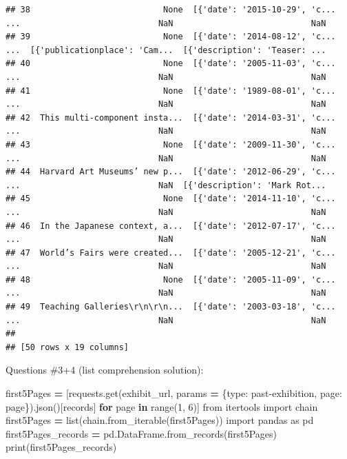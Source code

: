 \documentclass[
]{book}
\newenvironment{Shaded}{\begin{snugshade}}{\end{snugshade}}
\newcommand{\BuiltInTok}[1]{#1}
\newcommand{\ControlFlowTok}[1]{\textcolor[rgb]{0.13,0.29,0.53}{\textbf{#1}}}
\newcommand{\DecValTok}[1]{\textcolor[rgb]{0.00,0.00,0.81}{#1}}
\newcommand{\ImportTok}[1]{#1}
\newcommand{\KeywordTok}[1]{\textcolor[rgb]{0.13,0.29,0.53}{\textbf{#1}}}
\newcommand{\NormalTok}[1]{#1}
\newcommand{\OperatorTok}[1]{\textcolor[rgb]{0.81,0.36,0.00}{\textbf{#1}}}
\newcommand{\StringTok}[1]{\textcolor[rgb]{0.31,0.60,0.02}{#1}}
\begin{document}
\begin{alert}
\begin{verbatim}
## 38                           None  [{'date': '2015-10-29', 'c...  ...                            NaN                            NaN
## 39                           None  [{'date': '2014-08-12', 'c...  ...  [{'publicationplace': 'Cam...  [{'description': 'Teaser: ...
## 40                           None  [{'date': '2005-11-03', 'c...  ...                            NaN                            NaN
## 41                           None  [{'date': '1989-08-01', 'c...  ...                            NaN                            NaN
## 42  This multi-component insta...  [{'date': '2014-03-31', 'c...  ...                            NaN                            NaN
## 43                           None  [{'date': '2009-11-30', 'c...  ...                            NaN                            NaN
## 44  Harvard Art Museums’ new p...  [{'date': '2012-06-29', 'c...  ...                            NaN  [{'description': 'Mark Rot...
## 45                           None  [{'date': '2014-11-10', 'c...  ...                            NaN                            NaN
## 46  In the Japanese context, a...  [{'date': '2012-07-17', 'c...  ...                            NaN                            NaN
## 47  World’s Fairs were created...  [{'date': '2005-12-21', 'c...  ...                            NaN                            NaN
## 48                           None  [{'date': '2005-11-09', 'c...  ...                            NaN                            NaN
## 49  Teaching Galleries\r\n\r\n...  [{'date': '2003-03-18', 'c...  ...                            NaN                            NaN
## 
## [50 rows x 19 columns]
\end{verbatim}

Questions \#3+4 (list comprehension solution):

\begin{Shaded}
\begin{Highlighting}[]
\NormalTok{first5Pages }\OperatorTok{=}\NormalTok{ [requests.get(exhibit\_url, params }\OperatorTok{=}\NormalTok{ \{}\StringTok{\textquotesingle{}type\textquotesingle{}}\NormalTok{: }\StringTok{\textquotesingle{}past{-}exhibition\textquotesingle{}}\NormalTok{, }\StringTok{\textquotesingle{}page\textquotesingle{}}\NormalTok{: page\}).json()[}\StringTok{\textquotesingle{}records\textquotesingle{}}\NormalTok{] }\ControlFlowTok{for}\NormalTok{ page }\KeywordTok{in} \BuiltInTok{range}\NormalTok{(}\DecValTok{1}\NormalTok{, }\DecValTok{6}\NormalTok{)]}
\ImportTok{from}\NormalTok{ itertools }\ImportTok{import}\NormalTok{ chain}
\NormalTok{first5Pages }\OperatorTok{=} \BuiltInTok{list}\NormalTok{(chain.from\_iterable(first5Pages))}
\ImportTok{import}\NormalTok{ pandas }\ImportTok{as}\NormalTok{ pd}
\NormalTok{first5Pages\_records }\OperatorTok{=}\NormalTok{ pd.DataFrame.from\_records(first5Pages)}
\BuiltInTok{print}\NormalTok{(first5Pages\_records)}
\end{Highlighting}
\end{Shaded}


\end{alert}
\end{document}
